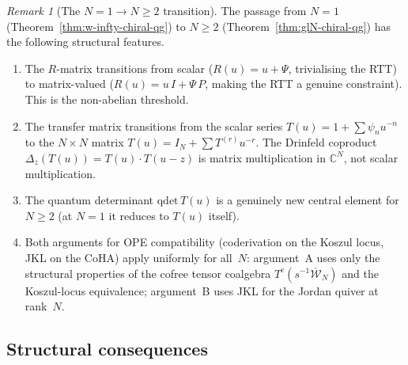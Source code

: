 \documentclass[11pt,reqno]{amsart}
\theoremstyle{definition}
\theoremstyle{remark}
\newtheorem{remark}[theorem]{Remark}
\newcommand{\cW}{\mathcal{W}}
\newcommand{\CC}{\mathbb{C}}
\numberwithin{equation}{section}
\begin{document}
\begin{remark}[The $N = 1 \to N \geq 2$ transition]
\label{rem:glN-transition}
The passage from $N = 1$
(Theorem~\ref{thm:w-infty-chiral-qg}) to $N \geq 2$
(Theorem~\ref{thm:glN-chiral-qg}) has the following
structural features.
\begin{enumerate}[label=\textup{(\arabic*)}]
\item The $R$-matrix transitions from scalar
  ($R(u) = u + \Psi$, trivialising the RTT) to
  matrix-valued ($R(u) = u\, I + \Psi\, P$, making
  the RTT a genuine constraint). This is the
  non-abelian threshold.
\item The transfer matrix transitions from the scalar
  series $T(u) = 1 + \sum \psi_n u^{-n}$ to the
  $N \times N$ matrix
  $T(u) = I_N + \sum T^{(r)} u^{-r}$.
  The Drinfeld coproduct
  $\Delta_z(T(u)) = T(u) \cdot T(u - z)$ is matrix
  multiplication in $\CC^N$, not scalar multiplication.
\item The quantum determinant $\mathrm{qdet}\, T(u)$ is a
  genuinely new central element for $N \geq 2$ (at
  $N = 1$ it reduces to $T(u)$ itself).
\item Both arguments for OPE compatibility (coderivation on
  the Koszul locus, JKL on the CoHA) apply uniformly for
  all~$N$: argument~A uses only the structural properties
  of the cofree tensor coalgebra
  $T^c(s^{-1}\overline{\cW}_N)$ and the Koszul-locus
  equivalence; argument~B uses JKL for the Jordan quiver
  at rank~$N$.
\end{enumerate}
\end{remark}


\subsection{Structural consequences}
\label{subsec:structural-consequences}
\end{document}
